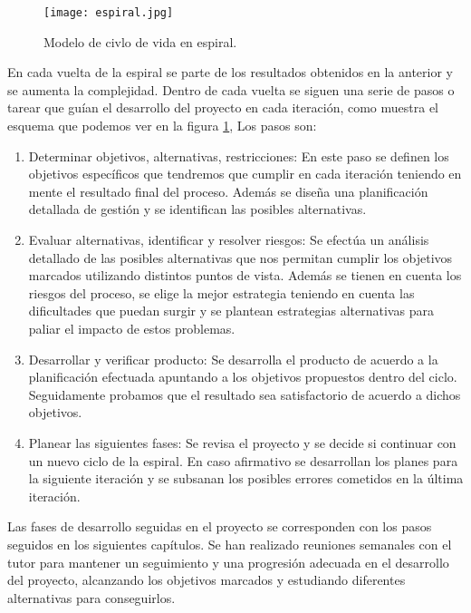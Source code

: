 \begin{figure}[hb]
	\centering\texttt{[image: espiral.jpg]}
	\caption{Modelo de civlo de vida en espiral.}
	\label{fig:espiral}
\end{figure}

En cada vuelta de la espiral se parte de los resultados obtenidos en la anterior y se aumenta la complejidad. Dentro de cada vuelta se siguen una serie de pasos o tarear que guían el desarrollo del proyecto en cada iteración, como muestra el esquema que podemos ver en la figura \ref{fig:espiral}, Los pasos son:
\begin{enumerate}[1.]
	\item Determinar objetivos, alternativas, restricciones: En este paso se definen los objetivos específicos que tendremos que cumplir en cada iteración teniendo en mente el resultado final del proceso. Además se diseña una planificación detallada de gestión y se identifican las posibles alternativas. 
	
	\item Evaluar alternativas, identificar y resolver riesgos: Se efectúa un análisis detallado de las posibles alternativas que nos permitan cumplir los objetivos marcados utilizando distintos puntos de vista. Además se tienen en cuenta los riesgos del proceso, se elige la mejor estrategia teniendo en cuenta las dificultades que puedan surgir y se plantean estrategias alternativas para paliar el impacto de estos problemas.
	
	\item Desarrollar y verificar producto: Se desarrolla el producto de acuerdo a la planificación efectuada apuntando a los objetivos propuestos dentro del ciclo. Seguidamente probamos que el resultado sea satisfactorio de acuerdo a dichos objetivos.
	
	\item Planear las siguientes fases: Se revisa el proyecto y se decide si continuar con un nuevo ciclo de la espiral. En caso afirmativo se desarrollan los planes para la siguiente iteración y se subsanan los posibles errores cometidos en la última iteración.
	
\end{enumerate}

Las fases de desarrollo seguidas en el proyecto se corresponden con los pasos seguidos en los siguientes capítulos. Se han realizado reuniones semanales con el tutor para mantener un seguimiento y una progresión adecuada en el desarrollo del proyecto, alcanzando los objetivos marcados y estudiando diferentes alternativas para conseguirlos.

